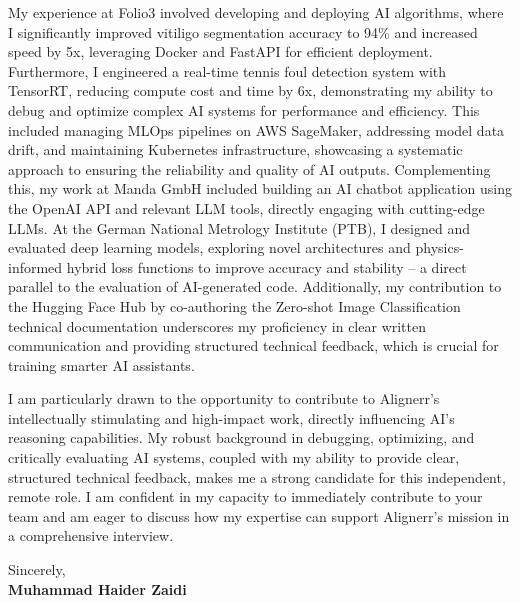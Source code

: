 \documentclass[letterpaper,11pt]{article}
\begin{document}
My experience at Folio3 involved developing and deploying AI algorithms, where I significantly improved vitiligo segmentation accuracy to 94\% and increased speed by 5x, leveraging Docker and FastAPI for efficient deployment. Furthermore, I engineered a real-time tennis foul detection system with TensorRT, reducing compute cost and time by 6x, demonstrating my ability to debug and optimize complex AI systems for performance and efficiency. This included managing MLOps pipelines on AWS SageMaker, addressing model data drift, and maintaining Kubernetes infrastructure, showcasing a systematic approach to ensuring the reliability and quality of AI outputs. Complementing this, my work at Manda GmbH included building an AI chatbot application using the OpenAI API and relevant LLM tools, directly engaging with cutting-edge LLMs. At the German National Metrology Institute (PTB), I designed and evaluated deep learning models, exploring novel architectures and physics-informed hybrid loss functions to improve accuracy and stability -- a direct parallel to the evaluation of AI-generated code. Additionally, my contribution to the Hugging Face Hub by co-authoring the Zero-shot Image Classification technical documentation underscores my proficiency in clear written communication and providing structured technical feedback, which is crucial for training smarter AI assistants.

I am particularly drawn to the opportunity to contribute to Alignerr's intellectually stimulating and high-impact work, directly influencing AI's reasoning capabilities. My robust background in debugging, optimizing, and critically evaluating AI systems, coupled with my ability to provide clear, structured technical feedback, makes me a strong candidate for this independent, remote role. I am confident in my capacity to immediately contribute to your team and am eager to discuss how my expertise can support Alignerr's mission in a comprehensive interview.

\vspace{12pt}

\noindent
Sincerely, \\
\vspace{20pt}
\noindent
\textbf{Muhammad Haider Zaidi}
\end{document}
